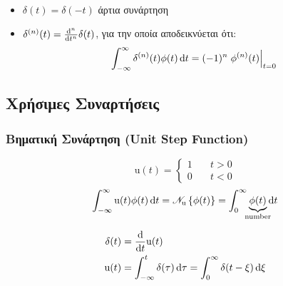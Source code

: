     \paragraph{}

    \begin{itemize}
    	\item \( \delta(t)=\delta(-t) \) άρτια συνάρτηση
    	\item \( \delta^{(n)}(t) = \od[n]{}{t}\delta(t) \), για την οποία
    αποδεικνύεται ότι:
        \[
            \int_{-\infty}^{\infty} \delta^{(n)}(t)\phi(t)\mathop{}\!\mathrm{d} t
            = (-1)^n\left.\phi^{(n)}(t)\right|_{t=0}
        \]
    \end{itemize}

    \subsection{Χρήσιμες Συναρτήσεις}

    \subsubsection{Βηματική Συνάρτηση (Unit Step Function)}
    \[
    \mathrm u(t) = \begin{cases}
    1 \quad & t > 0 \\
    0 \quad & t < 0
    \end{cases}
    \]
    \[
    \int_{-\infty}^{\infty} \mathrm u(t)\phi(t)\dif t =
    \mathscr N_{\mathrm u}\left\lbrace \phi(t) \right\rbrace =
    \int_0^\infty \underbrace{\phi(t)}_{\mathclap{\text{number}}}\dif t
    \]

    \begin{align*}
    \delta(t) &= \od{}{t} \mathrm u(t)\\
    \mathrm u(t) &= \int_{-\infty}^t \delta(\tau)\dif\tau =
    \int_0^\infty \delta(t-\xi)\dif\xi
    \end{align*}


